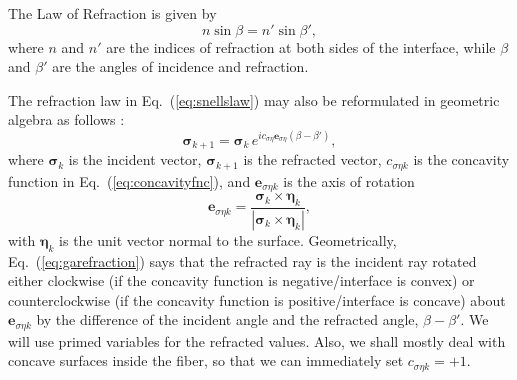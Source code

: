 \documentclass[a4paper,twocolumn,superscriptaddress]{revtex4-1}
\begin{document}
{The Law of Refraction is given by
\begin{equation} 
  \label{eq:snellslaw}
  n \sin \beta = n' \sin \beta' ,
\end{equation}
where $n$ and $n'$ are the indices of refraction at both sides of the interface, while 
$\beta$ and $\beta'$ are the angles of incidence and refraction.

The refraction law in Eq.~(\ref{eq:snellslaw}) may also be reformulated in geometric algebra as 
follows \cite{sugonAJP}:
\begin{equation}
  \label{eq:garefraction}
   \bm \sigma_{k+1} = 
  \bm \sigma_k \, e^{i c_{\sigma \eta} \mathbf e_{\sigma \eta} (\beta- \beta' )} ,
\end{equation}
where $\bm \sigma_k$ is the incident vector, $\bm \sigma_{k+1}$ is the refracted vector, $c_{\sigma \eta k}$ is the concavity function in Eq.~(\ref{eq:concavityfnc}), and $\mathbf e_{\sigma \eta k}$ is the axis of rotation
\begin{equation}
    \label{eq:axisofrotationfnc}
    \mathbf e_{\sigma \eta k} = 
    \frac{\bm \sigma_k \times \bm \eta_k}{|\bm \sigma_k \times \bm \eta_k|} ,
\end{equation}
with $\bm \eta_k$ is the unit vector normal to the surface. Geometrically, Eq.~(\ref{eq:garefraction}) says that the refracted ray is the incident ray rotated either clockwise (if the concavity function 
is negative/interface is convex) or counterclockwise (if the concavity function is 
positive/interface is concave) about $\mathbf e_{\sigma \eta k}$ by the difference of the 
incident angle and the refracted angle, $\beta - \beta'$. 
We will use primed variables for the refracted values.
Also, we shall mostly deal with concave surfaces inside the fiber, so that we can immediately 
set $c_{\sigma \eta k} = +1$.

}
\end{document}

